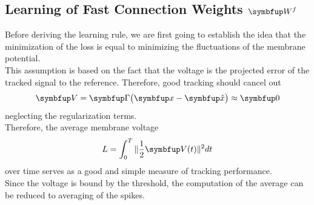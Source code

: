 \subsection{Learning of Fast Connection Weights $\bmu{W}^f$}
Before deriving the learning rule, we are first going to establish the idea that the minimization of the loss is equal to minimizing the fluctuations of the membrane potential.\\
This assumption is based on the fact that the voltage is the projected error of the tracked signal to the reference. Therefore, good tracking should cancel out
\begin{equation}
	\bmu{V} = \bmu{\Gamma}\big(\bmu{x} - \bmu{\hat{x}}\big) \approx \bmu{0}
\end{equation}
neglecting the regularization terms.\\
Therefore, the average membrane voltage
\begin{equation}
	L = \int_0^T\|\frac{1}{2}\bmu{V}(t)\|^2dt
\end{equation}
over time serves as a good and simple measure of tracking performance.\\
Since the voltage is bound by the threshold, the computation of the average can be reduced to averaging of the spikes.\\

